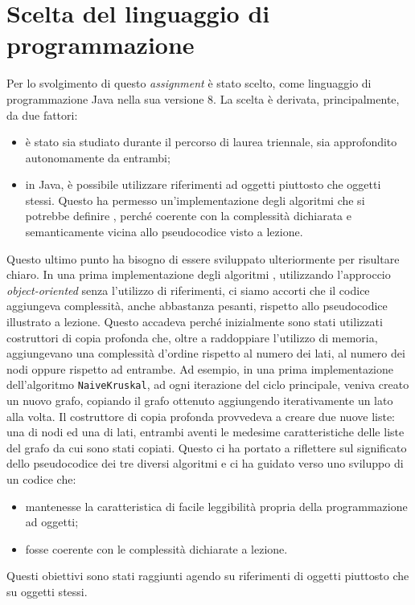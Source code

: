 \section{Scelta del linguaggio di programmazione}
Per lo svolgimento di questo \emph{assignment} è stato scelto, come linguaggio di programmazione Java nella sua versione 8. La scelta è derivata, principalmente, da due fattori: 
\begin{itemize}
	\item è stato sia studiato durante il percorso di laurea triennale, sia approfondito autonomamente da entrambi;
	\item in Java, è possibile utilizzare riferimenti ad oggetti piuttosto che oggetti stessi. Questo ha permesso un'implementazione degli algoritmi che si potrebbe definire , perché coerente con la complessità dichiarata e semanticamente vicina allo pseudocodice visto a lezione. 
\end{itemize}
Questo ultimo punto ha bisogno di essere sviluppato ulteriormente per risultare chiaro. In una prima implementazione degli algoritmi , utilizzando l'approccio \textit{object-oriented} senza l'utilizzo di riferimenti, ci siamo accorti che il codice aggiungeva complessità, anche abbastanza pesanti, rispetto allo pseudocodice illustrato a lezione. Questo accadeva perché inizialmente sono stati utilizzati costruttori di copia profonda che, oltre a raddoppiare l'utilizzo di memoria, aggiungevano una complessità d'ordine rispetto al numero dei lati, al numero dei nodi oppure rispetto ad entrambe. \eqcapo
Ad esempio, in una prima implementazione dell'algoritmo \texttt{NaiveKruskal}, ad ogni iterazione del ciclo principale, veniva creato un nuovo grafo, copiando il grafo ottenuto aggiungendo iterativamente un lato alla volta. Il costruttore di copia profonda provvedeva a creare due nuove liste: una di nodi ed una di lati, entrambi aventi le medesime caratteristiche delle liste del grafo da cui sono stati copiati.\eqcapo
 Questo ci ha portato a riflettere sul significato dello pseudocodice dei tre diversi algoritmi e ci ha guidato verso uno sviluppo di un codice che:
 \begin{itemize}
 	\item mantenesse la caratteristica di facile leggibilità propria della programmazione ad oggetti;
	\item fosse coerente con le complessità dichiarate a lezione.
 \end{itemize}
Questi obiettivi sono stati raggiunti agendo su riferimenti di oggetti piuttosto che su oggetti stessi.
\newpage
